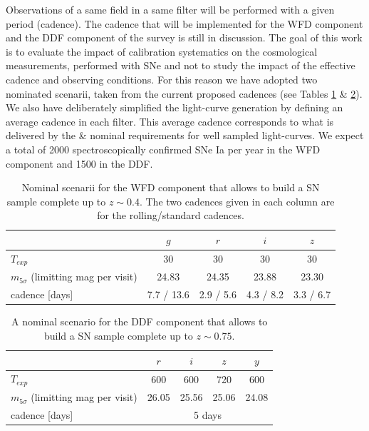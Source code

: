 \documentclass[\docopts]{\docclass}
\begin{document}
Observations of a same field in a same filter will be performed with a given period (cadence).
The cadence that will be implemented for the WFD component and the DDF component of the survey is still in discussion.
The goal of this work is to evaluate the impact of calibration systematics on the cosmological measurements, performed with SNe and not to study the impact of the effective cadence and observing conditions.
For this reason we have adopted two nominated scenarii, taken from the current proposed cadences (see Tables \ref{tab:nominal_scenario_wide} \& \ref{tab:nominal_scenario_DDF}).
We also have deliberately simplified the light-curve generation by defining an average cadence in each filter.
This average cadence corresponds to what is delivered by the  \&  nominal requirements for well sampled light-curves. We expect a total of 2000 spectroscopically confirmed SNe Ia per year in the WFD component and 1500 in the DDF.

\begin{table}[t]
\begin{center}
  \caption{Nominal scenarii for the WFD component that allows to build
    a SN sample complete up to $z \sim 0.4$. The two cadences given in
    each column are for the rolling/standard cadences.}
\label{tab:nominal_scenario_wide}
\begin{tabular}{l|cccc}
\hline
\hline
              & $g$ & $r$ & $i$ & $z$ \\
\hline 
$T_{exp}$      & 30       &   30    &  30        & 30  \\
$m_{5\sigma}$ (limitting mag per visit)  &  24.83   &  24.35   &  23.88    &  23.30  \\
cadence [days]       & 7.7 / 13.6 & 2.9 / 5.6 & 4.3 / 8.2 & 3.3 / 6.7  \\
\hline
\end{tabular}
\end{center}
\end{table}

\begin{table}[t]
\begin{center}
  \caption{A nominal scenario for the DDF component that allows to
    build a SN sample complete up to $z \sim 0.75$.}
\label{tab:nominal_scenario_DDF}
\begin{tabular}{l|cccc}
\hline
\hline
              & $r$ & $i$ & $z$ & $y$ \\
\hline 
$T_{exp}$      & 600 & 600 & 720 & 600 \\
$m_{5\sigma}$ (limitting mag per visit)  & 26.05 & 25.56 & 25.06 & 24.08 \\
cadence  [days]     &  \multicolumn{4}{c}{5 days} \\
\hline
\end{tabular}
\end{center}
\end{table}
\end{document}
